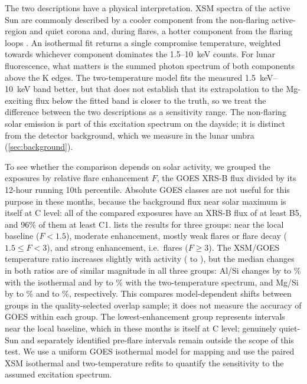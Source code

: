 The two descriptions have a physical interpretation. XSM spectra of the active Sun are commonly described by a cooler component from the non-flaring active-region and quiet corona and, during flares, a hotter component from the flaring loops \citep{Mondal2021,Ng2024}. An isothermal fit returns a single compromise temperature, weighted towards whichever component dominates the 1.5--\SI{10}{keV} counts. For lunar fluorescence, what matters is the summed photon spectrum of both components above the K edges. The two-temperature model fits the measured \SIrange{1.5}{10}{keV} band better, but that does not establish that its extrapolation to the Mg-exciting flux below the fitted band is closer to the truth, so we treat the difference between the two descriptions as a sensitivity range. The non-flaring solar emission is part of this excitation spectrum on the dayside; it is distinct from the detector background, which we measure in the lunar umbra (\cref{sec:background}).

To see whether the comparison depends on solar activity, we grouped the exposures by relative flare enhancement $F$, the GOES XRS-B flux divided by its 12-hour running 10th percentile. Absolute GOES classes are not useful for this purpose in these months, because the background flux near solar maximum is itself at C level: all of the compared exposures have an XRS-B flux of at least B5, and 96\% of them at least C1.  lists the results for three groups: near the local baseline ($F<1.5$), moderate enhancement, mostly weak flares or flare decay ($1.5\le F<3$), and strong enhancement, i.e.\ flares ($F\geq3$). The XSM/GOES temperature ratio increases slightly with activity (\XsmRegLoTRatio{} to \XsmRegHiTRatio), but the median changes in both ratios are of similar magnitude in all three groups: Al/Si changes by \XsmRegLoOneAl{} to \XsmRegMidOneAl\% with the isothermal and by \XsmRegLoTwoAl{} to \XsmRegHiTwoAl\% with the two-temperature spectrum, and Mg/Si by \XsmRegHiOneMg{} to \XsmRegMidOneMg\% and \XsmRegLoTwoMg{} to \XsmRegHiTwoMg\%, respectively. This compares model-dependent shifts between groups in the quality-selected overlap sample; it does not measure the accuracy of GOES within each group. The lowest-enhancement group represents intervals near the local baseline, which in these months is itself at C level; genuinely quiet-Sun and separately identified pre-flare intervals remain outside the scope of this test. We use a uniform GOES isothermal model for mapping and use the paired XSM isothermal and two-temperature refits to quantify the sensitivity to the assumed excitation spectrum.

